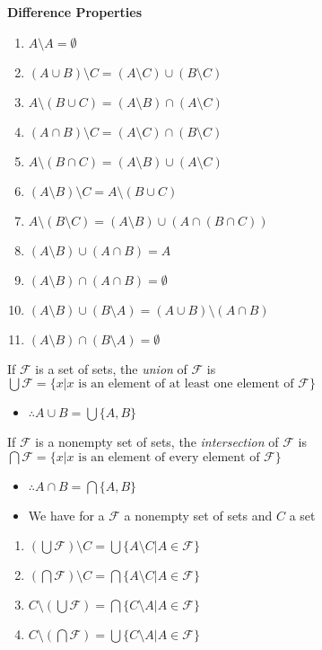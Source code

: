 \textbf{Difference Properties}
\begin{enumerate}
	\item $A \setminus A = \emptyset$
	\item $(A \cup B) \setminus C = (A \setminus C) \cup (B \setminus C)$
	\item $A \setminus (B \cup C) = (A \setminus B) \cap (A \setminus C)$
	\item $(A \cap B) \setminus C = (A \setminus C) \cap (B \setminus C)$
	\item $A \setminus (B \cap C) = (A \setminus B) \cup (A \setminus C)$
	\item $(A \setminus B) \setminus C = A \setminus (B \cup C)$
	\item $A \setminus (B \setminus C) = (A \setminus B) \cup (A \cap (B \cap
		      C))$
	\item $(A \setminus B) \cup (A \cap B) = A$
	\item $(A \setminus B) \cap (A \cap B) = \emptyset$
	\item $(A \setminus B) \cup (B \setminus A) = (A \cup B) \setminus (A
		      \cap B)$
	\item $(A \setminus B) \cap (B \setminus A) = \emptyset$
\end{enumerate}

\begin{definition}
	If $\mathcal{F}$ is a set of sets, the \textit{union} of
	$\mathcal{F}$ is $\bigcup \mathcal{F} = \{x | x \text{ is an element of at
			least  one element of } \mathcal{F}\}$
\end{definition}
\begin{itemize}
	\item $\therefore A \cup B = \bigcup \{A, B\}$
\end{itemize}

\begin{definition}
	If $\mathcal{F}$ is a nonempty set of sets, the \textit{intersection} of
	$\mathcal{F}$ is $\bigcap \mathcal{F} = \{ x | x \text{ is an element of every
			element of } \mathcal{F}\}$
\end{definition}
\begin{itemize}
	\item $\therefore A \cap B = \bigcap \{A,B\}$
	\item We have for a $\mathcal{F}$ a nonempty set of sets and $C$ a set
\end{itemize}
\begin{enumerate}
	\item $(\bigcup \mathcal{F}) \setminus C = \bigcup \{A \setminus C | A \in
		      \mathcal{F}\}$
	\item $(\bigcap \mathcal{F}) \setminus C = \bigcap \{A \setminus C | A \in
		      \mathcal{F}\}$
	\item $C \setminus (\bigcup \mathcal{F}) = \bigcap \{ C \setminus A | A \in
		      \mathcal{F}\}$
	\item $C \setminus(\bigcap \mathcal{F}) = \bigcup \{ C \setminus A | A \in
		      \mathcal{F}\}$
\end{enumerate}

